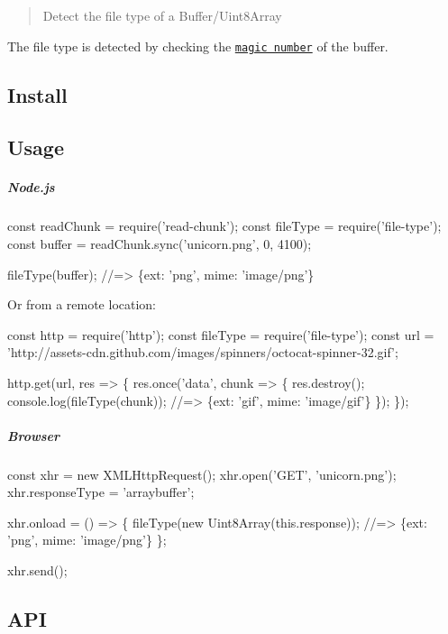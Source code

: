 \begin{quote}
Detect the file type of a Buffer/\+Uint8\+Array \end{quote}


The file type is detected by checking the \href{http://en.wikipedia.org/wiki/Magic_number_(programming)#Magic_numbers_in_files}{\tt magic number} of the buffer.

\subsection*{Install}




\subsection*{Usage}

\subparagraph*{Node.\+js}


\begin{DoxyCode}
const readChunk = require('read-chunk');
const fileType = require('file-type');
const buffer = readChunk.sync('unicorn.png', 0, 4100);

fileType(buffer);
//=> \{ext: 'png', mime: 'image/png'\}
\end{DoxyCode}


Or from a remote location\+:


\begin{DoxyCode}
const http = require('http');
const fileType = require('file-type');
const url = 'http://assets-cdn.github.com/images/spinners/octocat-spinner-32.gif';

http.get(url, res => \{
  res.once('data', chunk => \{
    res.destroy();
    console.log(fileType(chunk));
    //=> \{ext: 'gif', mime: 'image/gif'\}
  \});
\});
\end{DoxyCode}


\subparagraph*{Browser}


\begin{DoxyCode}
const xhr = new XMLHttpRequest();
xhr.open('GET', 'unicorn.png');
xhr.responseType = 'arraybuffer';

xhr.onload = () => \{
  fileType(new Uint8Array(this.response));
  //=> \{ext: 'png', mime: 'image/png'\}
\};

xhr.send();
\end{DoxyCode}


\subsection*{A\+PI}

